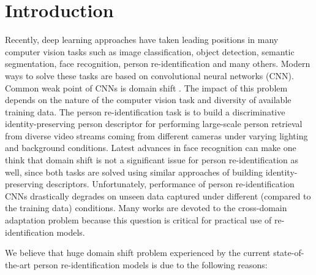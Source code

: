 \documentclass[a4paper,conference]{IEEEtran}
\begin{document}
\section{Introduction}
Recently, deep learning approaches have taken leading positions in many
computer vision tasks such as image classification, object detection, semantic
segmentation, face recognition, person re-identification
\cite{alexnet,Girshick2013RichFH,Shelhamer2014FullyCN,GoogleFaceNet,firstCNNReid}
and many others.  Modern ways to solve these tasks are based on convolutional
neural networks (CNN).  Common weak point of CNNs is domain shift
\cite{baselineCrossDomain,segmDomainShift}. The impact of this problem depends
on the nature of the computer vision task and diversity of available training
data.  The person re-identification task is to build a discriminative
identity-preserving person descriptor for performing large-scale person retrieval
from diverse video streams coming from different cameras under varying lighting
and background conditions. Latest advances in face recognition
\cite{deng2018arcface,amSoftmax} can make one think that domain shift is not a
significant issue for person re-identification as well, since both tasks are
solved using similar approaches of building identity-preserving
descriptors. Unfortunately, performance of person re-identification CNNs
drastically degrades on unseen data captured under different (compared to the
training data) conditions. Many works are devoted to the cross-domain adaptation
problem \cite{baselineCrossDomain,inDefenceTriplet2,yuan2019calibrated} because
this question is critical for practical use of re-identification models.

We believe that huge domain shift problem experienced by the current
state-of-the-art person re-identification models is due to the following
reasons:
\end{document}
